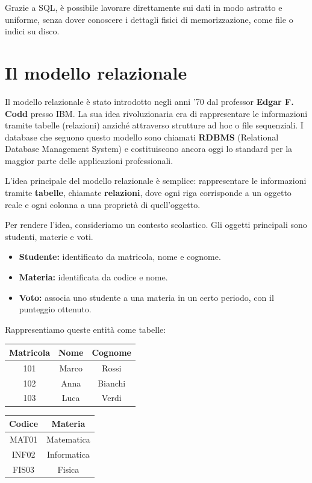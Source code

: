\documentclass[a4paper,12pt]{article}
\begin{document}
Grazie a SQL, è possibile lavorare direttamente sui dati in modo astratto e uniforme, senza dover conoscere i dettagli fisici di memorizzazione, come file o indici su disco.



\newpage
\newpage
\section{Il modello relazionale}

Il modello relazionale è stato introdotto negli anni '70 dal professor \textbf{Edgar F. Codd} presso IBM.  
La sua idea rivoluzionaria era di rappresentare le informazioni tramite tabelle (relazioni) anziché attraverso strutture ad hoc o file sequenziali.  
I database che seguono questo modello sono chiamati \textbf{RDBMS} (Relational Database Management System) e costituiscono ancora oggi lo standard per la maggior parte delle applicazioni professionali.

L'idea principale del modello relazionale è semplice: rappresentare le informazioni tramite \textbf{tabelle}, chiamate \textbf{relazioni}, dove ogni riga corrisponde a un oggetto reale e ogni colonna a una proprietà di quell'oggetto.


Per rendere l'idea, consideriamo un contesto scolastico. Gli oggetti principali sono studenti, materie e voti.  

\begin{itemize}
    \item \textbf{Studente:} identificato da matricola, nome e cognome.
    \item \textbf{Materia:} identificata da codice e nome.
    \item \textbf{Voto:} associa uno studente a una materia in un certo periodo, con il punteggio ottenuto.
\end{itemize}

Rappresentiamo queste entità come tabelle:

\begin{center}
\begin{tabular}{|c|c|c|}
\hline
\textbf{Matricola} & \textbf{Nome} & \textbf{Cognome} \\
\hline
101 & Marco & Rossi \\
102 & Anna & Bianchi \\
103 & Luca & Verdi \\
\hline
\end{tabular}
\hspace{1cm}
\begin{tabular}{|c|c|}
\hline
\textbf{Codice} & \textbf{Materia} \\
\hline
MAT01 & Matematica \\
INF02 & Informatica \\
FIS03 & Fisica \\
\hline
\end{tabular}
\end{center}
\end{document}
